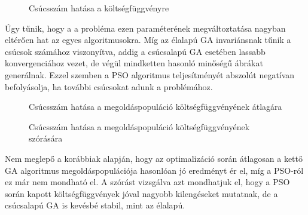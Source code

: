 \begin{figure}[H]
	\centering
	\hspace{5pt}
	\hspace{5pt}
	\caption{Csúcsszám hatása a költségfüggvényre}
	\label{fig:node_size_cost}
\end{figure}

Úgy tűnik, hogy a a probléma ezen paraméterének megváltoztatása nagyban eltérően hat az egyes algoritmusokra. Míg az élalapú GA invariánsnak tűnik a csúcsok számához viszonyítva, addig a csúcsalapú GA esetében lassabb konvergenciához vezet, de végül mindketten hasonló minőségű ábrákat generálnak. Ezzel szemben a PSO algoritmus teljesítményét abszolút negatívan befolyásolja, ha további csúcsokat adunk a problémához.

\begin{figure}[H]
	\centering
	\hspace{5pt}
	\hspace{5pt}
	\caption{Csúcsszám hatása a megoldáspopuláció költségfüggvényének átlagára}
	\label{fig:node_size_cost_mean}
\end{figure}

\begin{figure}[H]
	\centering
	\hspace{5pt}
	\hspace{5pt}
	\caption{Csúcsszám hatása a megoldáspopuláció költségfüggvényének szórására}
	\label{fig:node_size_cost_std}
\end{figure}

Nem meglepő a korábbiak alapján, hogy az optimalizáció során átlagosan a kettő GA algoritmus megoldáspopulációja hasonlóan jó eredményt ér el, míg a PSO-ról ez már nem mondható el. A szórást vizsgálva azt mondhatjuk el, hogy a PSO során kapott költségfüggvények jóval nagyobb kilengéseket mutatnak, de a csúcsalapú GA is kevésbé stabil, mint az élalapú.

